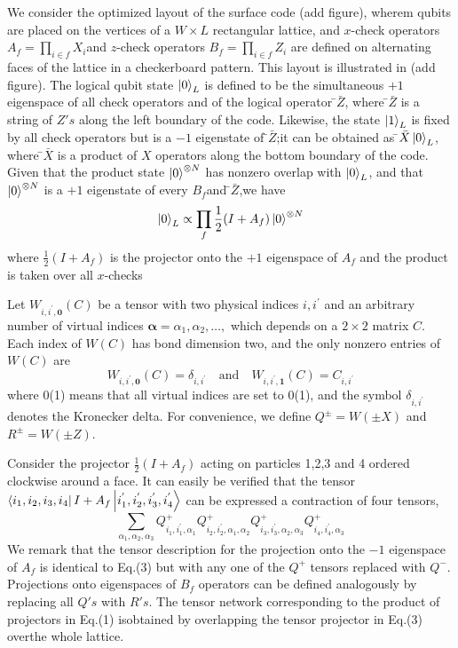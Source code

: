 We consider the optimized layout of the surface code (add figure), wherem qubits are placed on the vertices of a \(W \times L\) rectangular lattice, and \(x\)-check operators \(A_f = \prod_{i \in f }X_i\)and \(z\)-check operators \(B_f = \prod_{i \in f}Z_i\) are defined on alternating faces of the lattice in a checkerboard pattern. This layout is illustrated in (add figure). The logical qubit state \(\ket{0}_L\) is defined to be the simultaneous \(+1\) eigenspace of all check operators and of the logical operator ̄\(\bar{Z}\), where ̄\(\bar{Z}\) is a string of \(Z's\) along the left boundary of the code. Likewise, the state \(\ket{1}_L\) is fixed by all check operators but is a \(-1\) eigenstate of ̄\(\bar{Z}\);it can be obtained as ̄\(\bar{X}\ket{0}_L\), where ̄\(\bar{X}\) is a product of \(X\) operators along the bottom boundary of the code. Given that the product state \(\ket{0}^{\otimes N}\) has nonzero overlap with \(\ket{0}_L\), and that \(\ket{0}^{\otimes N}\) is a \(+1\) eigenstate of every \(B_f\)and ̄\(\bar{Z}\),we have
\begin{equation*}
    \ket{0}_L \propto \prod_{f} \frac{1}{2} (I + A_f) \ket{0}^{\otimes N}
\end{equation*}
where \(\frac{1}{2}(I+A_f)\) is the projector onto the \(+1\) eigenspace of \(A_f\) and the product is taken over all \(x\)-checks

Let \(W_{i, i^{'},\mathbf{0}}(C)\) be a tensor with two physical indices \(i, i^{'}\) and an arbitrary number of virtual indices \(\mathbf{\alpha} = \alpha_1, \alpha_2,\dots,\) which depends on a \(2 \times 2\) matrix \(C\). Each index of \(W(C)\) has bond dimension two, and the only nonzero entries of \(W(C)\) are
\begin{equation*}
    W_{i, i^{'},\mathbf{0}}(C) = \delta_{i, i^{'}} \quad \text{and} \quad  W_{i, i^{'},\mathbf{1}}(C) = C_{i, i^{'}}
\end{equation*}
where 0(1) means that all virtual indices are set to 0(1), and the symbol \(\delta_{i, i^{'}}\) denotes the Kronecker delta. For convenience, we define \(Q^{\pm} = W(\pm X)\) and \(R^{\pm} = W(\pm Z)\).

Consider the projector \(\frac{1}{2}(I+A_f)\) acting on particles 1,2,3 and 4 ordered clockwise around a face. It can easily be verified that the tensor  \(\bra{i_1, i_2, i_3, i_4} I + A_f \ket{i_1^{'}, i_2^{'}, i_3^{'}, i_4^{'}}\) can be expressed a contraction of four tensors,
\begin{equation*}
    \sum_{\alpha_1, \alpha_2, \alpha_3} Q^{+}_{i_1, i_1^{'},\alpha_1} Q^{+}_{i_2, i_2^{'},\alpha_1, \alpha_2} Q^{+}_{i_3, i_3^{'},\alpha_2, \alpha_3} Q^{+}_{i_4, i_4^{'},\alpha_3}
\end{equation*}
We remark that the tensor description for the projection onto the \(-1\) eigenspace of \(A_f\) is identical to Eq.(3) but with any one of the \(Q^{+}\) tensors replaced with \(Q^-\). Projections onto eigenspaces of \(B_f\) operators can be defined analogously by replacing all \(Q's\) with \(R's\). The tensor network corresponding to the product of projectors in Eq.(1) isobtained by overlapping the tensor projector in Eq.(3) overthe whole lattice.

